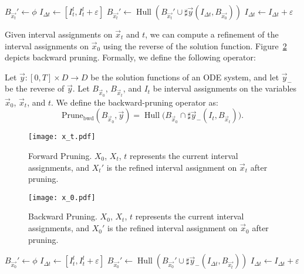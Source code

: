 \documentclass[11pt]{article}
\newcommand{\prunefwd}{\mathrm{Prune}_{\mathrm{fwd}}}
\newcommand{\prunebwd}{\mathrm{Prune}_{\mathrm{bwd}}}
\newcommand{\BXt}{\ensuremath{B_{\vec{x_t}}}}
\newcommand{\BXz}{\ensuremath{B_{\vec{x_0}}}}
\DeclareMathOperator{\Hull}{Hull}
\begin{document}
\begin{algorithm}\label{alg:ForwardP}
\caption{$\prunefwd(\sharp{\vec{y}}, \BXz, \BXt, I_t)$}\label{forward}
\begin{algorithmic}[1]
  \State $\BXt' \gets \phi$\;
  \State $I_{{\Delta}t} \gets [I_t^l, I_t^l + {\varepsilon}]$\;
      \State $\BXt' \gets \Hull(\BXt' \cup \sharp{\vec{y}}({{I_{{\Delta}t}}}, \BXz))$
      \State ${{I_{{\Delta}t}}} \gets {I_{{\Delta}t}} + {\varepsilon}$
  \EndWhile
  \State \Return{$\BXt \cap \BXt'$}
\end{algorithmic}
\end{algorithm}

 Given interval assignments on $\vec x_t$ and $t$, we can compute a refinement of the interval assignments on $\vec x_0$ using the reverse of the solution function. Figure~\ref{x0p} depicts backward pruning. Formally, we define the following operator:
\begin{definition}
Let $\vec y:[0,T]\times D\rightarrow D$ be the solution functions of an ODE system, and let $\vec y_-$ be the reverse of $\vec y$. Let $B_{\vec x_0}$, $B_{\vec x_t}$, and $I_{t}$ be interval assignments on the variables $\vec x_0$, $\vec x_t$, and $t$. We define the backward-pruning operator as:
$$\mathrm{Prune}_{\mathrm{bwd}}(B_{\vec x_0}, \vec y) =\Hull\Big(B_{\vec x_0}\cap \sharp \vec y_-(I_t, B_{\vec x_t})\Big).$$
\end{definition}
\begin{figure}
\begin{center}
\texttt{[image: x\_t.pdf]}
\end{center}
\caption{Forward Pruning. $X_0$, $X_t$, $t$ represents the current interval assignments, and $X_t'$ is the refined interval assignment on $\vec x_t$ after pruning.}\label{xtp}
\end{figure}

\begin{figure}
\begin{center}
\texttt{[image: x\_0.pdf]}
\end{center}
\caption{Backward Pruning. $X_0$, $X_t$, $t$ represents the current interval assignments, and $X_0'$ is the refined interval assignment on $\vec x_0$ after pruning.
}\label{x0p}
\end{figure}

\begin{algorithm}\label{alg:BackwardP}
\caption{$\prunebwd(\sharp{\vec{y}}, \BXz, \BXt, I_t)$}\label{backward}
\begin{algorithmic}[1]
  \State $\BXz' \gets \phi$
  \State ${{I_{{\Delta}t}}} \gets [I_t^l, I_t^l + {\varepsilon}]$
      \State $\BXz' \gets \Hull(\BXz' \cup \sharp{\vec{y}_{-}}({{I_{{\Delta}t}}}, \BXt))$
      \State ${{I_{{\Delta}t}}} \gets {I_{{\Delta}t}} + {\varepsilon}$
  \EndWhile
  \State \Return{$\BXz \cap \BXz'$}
\end{algorithmic}
\end{algorithm}
\end{document}
